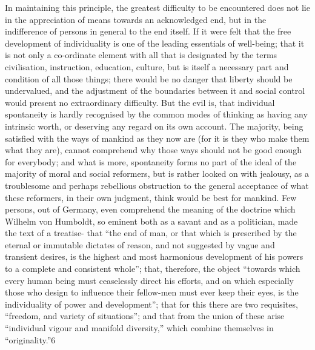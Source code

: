 \documentclass[11pt,openany]{book}
\begin{document}
In maintaining this principle, the greatest difficulty to be encountered does not lie in the appreciation of means towards an acknowledged end, but in the indifference of persons in general to the end itself. If it were felt that the free development of individuality is one of the leading essentials of well-being; that it is not only a co-ordinate element with all that is designated by the terms civilisation, instruction, education, culture, but is itself a necessary part and condition of all those things; there would be no danger that liberty should be undervalued, and the adjustment of the boundaries between it and social control would present no extraordinary difficulty. But the evil is, that individual spontaneity is hardly recognised by the common modes of thinking as having any intrinsic worth, or deserving any regard on its own account. The majority, being satisfied with the ways of mankind as they now are (for it is they who make them what they are), cannot comprehend why those ways should not be good enough for everybody; and what is more, spontaneity forms no part of the ideal of the majority of moral and social reformers, but is rather looked on with jealousy, as a troublesome and perhaps rebellious obstruction to the general acceptance of what these reformers, in their own judgment, think would be best for mankind. Few persons, out of Germany, even comprehend the meaning of the doctrine which Wilhelm von Humboldt, so eminent both as a savant and as a politician, made the text of a treatise- that ``the end of man, or that which is prescribed by the eternal or immutable dictates of reason, and not suggested by vague and transient desires, is the highest and most harmonious development of his powers to a complete and consistent whole''; that, therefore, the object ``towards which every human being must ceaselessly direct his efforts, and on which especially those who design to influence their fellow-men must ever keep their eyes, is the individuality of power and development''; that for this there are two requisites, ``freedom, and variety of situations''; and that from the union of these arise ``individual vigour and manifold diversity,'' which combine themselves in ``originality.''6
\end{document}
